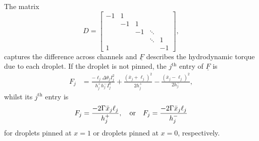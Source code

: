 \begin{subappendices}
The matrix
\begin{equation}
D =  \begin{bmatrix}
-1 & 1  & & & \\
 & -1& 1  \\
& & -1& \ddots &\\
& &  & \ddots &1  \\
1& && &-1
\end{bmatrix},
\end{equation}
captures the difference across channels and $\underline{F}$ describes the hydrodynamic torque due to each droplet. If the droplet is not pinned, the  $j^{\text{th}}$ entry of $\underline{F}$ is
\begin{align}
F_j &=\frac{-\ell_{j}\Delta \theta_{j}I^2_j}{ h_j^+ h_j^-I^0_j}  + \frac{(\bar{x}_{j}+\ell_{j})^2}{2h_{j}^+} - \frac{(\bar{x}_{j}-\ell_{j})^2}{2h_{j}^-},
\label{A:E:MDE:F_definition}
\end{align}
whilst its $j^{\text{th}}$ entry is
\begin{equation}
F_j =\frac{-2\Gamma \bar{x}_j \ell_j}{h_j^+}, \quad \text{or}  \quad F_j=  \frac{-2\Gamma \bar{x}_j \ell_j}{h_j^-}
\end{equation}
for droplets pinned at $x = 1$ or droplets pinned at $x = 0$, respectively.


\end{subappendices}

